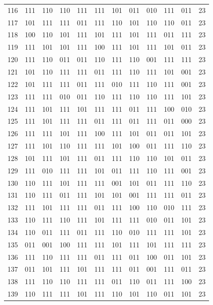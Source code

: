 \begin{longtable}{r*{10}{c}r}
116 & 111 & 110 & 110 & 111 & 111 & 101 & 011 & 010 & 111 & 011 & 23\\
117 & 101 & 111 & 111 & 011 & 111 & 110 & 101 & 110 & 110 & 011 & 23\\
118 & 100 & 110 & 101 & 111 & 101 & 111 & 101 & 111 & 011 & 111 & 23\\
119 & 111 & 101 & 101 & 111 & 100 & 111 & 101 & 111 & 101 & 011 & 23\\
120 & 111 & 110 & 011 & 011 & 110 & 111 & 110 & 001 & 111 & 111 & 23\\
121 & 101 & 110 & 111 & 111 & 011 & 111 & 110 & 111 & 101 & 001 & 23\\
122 & 101 & 111 & 111 & 011 & 111 & 010 & 111 & 110 & 111 & 001 & 23\\
123 & 111 & 111 & 010 & 011 & 110 & 111 & 110 & 110 & 111 & 101 & 23\\
124 & 111 & 101 & 111 & 101 & 111 & 111 & 011 & 111 & 100 & 010 & 23\\
125 & 111 & 101 & 111 & 111 & 011 & 111 & 011 & 111 & 011 & 000 & 23\\
126 & 111 & 111 & 101 & 111 & 100 & 111 & 101 & 011 & 011 & 101 & 23\\
127 & 111 & 101 & 110 & 111 & 111 & 101 & 100 & 011 & 111 & 110 & 23\\
128 & 101 & 111 & 101 & 111 & 011 & 111 & 110 & 110 & 101 & 011 & 23\\
129 & 111 & 010 & 111 & 111 & 101 & 011 & 111 & 110 & 111 & 001 & 23\\
130 & 110 & 111 & 101 & 111 & 111 & 001 & 101 & 011 & 111 & 110 & 23\\
131 & 110 & 111 & 011 & 111 & 101 & 101 & 001 & 111 & 111 & 011 & 23\\
132 & 111 & 101 & 111 & 111 & 011 & 111 & 100 & 110 & 010 & 111 & 23\\
133 & 110 & 111 & 110 & 111 & 101 & 111 & 111 & 010 & 011 & 101 & 23\\
134 & 110 & 011 & 111 & 011 & 111 & 110 & 010 & 111 & 111 & 101 & 23\\
135 & 011 & 001 & 100 & 111 & 111 & 101 & 111 & 101 & 111 & 111 & 23\\
136 & 111 & 110 & 111 & 111 & 011 & 111 & 011 & 100 & 011 & 101 & 23\\
137 & 011 & 101 & 111 & 101 & 111 & 111 & 011 & 001 & 111 & 011 & 23\\
138 & 111 & 110 & 110 & 111 & 111 & 011 & 110 & 011 & 111 & 100 & 23\\
139 & 110 & 111 & 111 & 101 & 111 & 110 & 101 & 110 & 011 & 101 & 23\\

\end{longtable}
